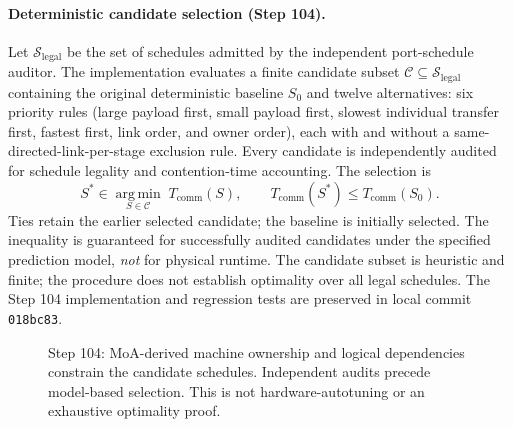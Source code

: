 \documentclass[11pt]{article}
\begin{document}
\paragraph{Deterministic candidate selection (Step 104).}
Let $\mathcal{S}_{\mathrm{legal}}$ be the set of schedules admitted by the
independent port-schedule auditor. The implementation evaluates a finite
candidate subset $\mathcal{C}\subseteq\mathcal{S}_{\mathrm{legal}}$
containing the original deterministic baseline $S_0$ and twelve alternatives:
six priority rules (large payload first, small payload first, slowest
individual transfer first, fastest first, link order, and owner order),
each with and without a same-directed-link-per-stage exclusion rule.
Every candidate is independently audited for schedule legality and
contention-time accounting. The selection is
\begin{equation}
 S^*\in\underset{S\in\mathcal{C}}{\operatorname{arg\,min}}\;
 T_{\mathrm{comm}}(S),\qquad
 T_{\mathrm{comm}}(S^*)\le T_{\mathrm{comm}}(S_0).
 \label{eq:step104-selection}
\end{equation}
Ties retain the earlier selected candidate; the baseline is initially
selected. The inequality is guaranteed for successfully audited candidates
under the specified prediction model, \emph{not} for physical runtime.
The candidate subset is heuristic and finite; the procedure does not
establish optimality over all legal schedules. The Step 104 implementation
and regression tests are preserved in local commit \texttt{018bc83}.

\begin{figure}[htbp]
\centering
{}
\caption{Step 104: MoA-derived machine ownership and logical dependencies
constrain the candidate schedules. Independent audits precede model-based
selection. This is not hardware-autotuning or an exhaustive optimality proof.}
\label{fig:step104-selection}
\end{figure}
\end{document}
